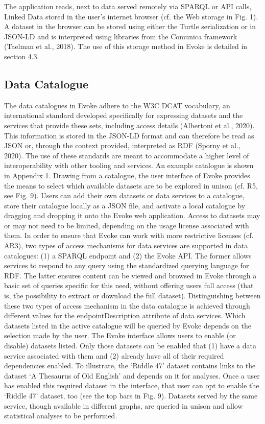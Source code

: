 The application reads, next to data served remotely via SPARQL or API calls, Linked Data stored in the user’s internet browser (cf. the Web storage in Fig. 1). A dataset in the browser can be stored using either the Turtle serialization or in JSON-LD and is interpreted using libraries from the Comunica framework (Taelman et al., 2018).  The use of this storage method in Evoke is detailed in section 4.3.

\subsection{Data Catalogue}
The data catalogues in Evoke adhere to the W3C DCAT vocabulary, an international standard developed specifically for expressing datasets and the services that provide these sets, including access details (Albertoni et al., 2020). This information is stored in the JSON-LD format and can therefore be read as JSON or, through the context provided, interpreted as RDF (Sporny et al., 2020). The use of these standards are meant to accommodate a higher level of interoperability with other tooling and services. An example catalogue is shown in Appendix 1. Drawing from a catalogue, the user interface of Evoke provides the means to select which available datasets are to be explored in unison (cf. R5, see Fig. 9). Users can add their own datasets or data services to a catalogue, store their catalogue locally as a JSON file, and activate a local catalogue by dragging and dropping it onto the Evoke web application. 
Access to datasets may or may not need to be limited, depending on the usage license associated with them. In order to ensure that Evoke can work with more restrictive licenses (cf. AR3), two types of access mechanisms for data services are supported in data catalogues: (1) a SPARQL endpoint and (2) the Evoke API. The former allows services to respond to any query using the standardized querying language for RDF. The latter ensures content can be viewed and browsed in Evoke through a basic set of queries specific for this need, without offering users full access (that is, the possibility to extract or download the full dataset).  Distinguishing between these two types of access mechanism in the data catalogue is achieved through different values for the endpointDescription attribute of data services. 
Which datasets listed in the active catalogue will be queried by Evoke depends on the selection made by the user. The Evoke interface allows users to enable (or disable) datasets listed. Only those datasets can be enabled that (1) have a data service associated with them and (2) already have all of their required dependencies enabled. To illustrate, the ‘Riddle 47’ dataset contains links to the dataset ‘A Thesaurus of Old English’ and depends on it for analyses. Once a user has enabled this required dataset in the interface, that user can opt to enable the ‘Riddle 47’ dataset, too (see the top bars in Fig. 9). Datasets served by the same service, though available in different graphs, are queried in unison and allow statistical analyses to be performed. 

